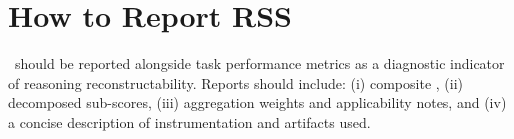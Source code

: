 \section{How to Report RSS}
\label{app:reporting}

\RSS\ should be reported alongside task performance metrics as a diagnostic indicator of reasoning reconstructability. Reports should include: (i) composite \RSS, (ii) decomposed sub-scores, (iii) aggregation weights and applicability notes, and (iv) a concise description of instrumentation and artifacts used.
